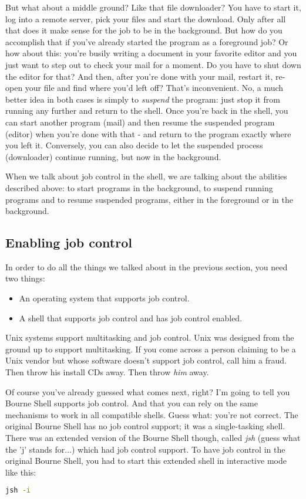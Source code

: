 But what about a middle ground? Like that file downloader? You have to start
it, log into a remote server, pick your files and start the download. Only
after all that does it make sense for the job to be in the background. But how
do you accomplish that if you've already started the program as a foreground
job? Or how about this: you're busily writing a document in your favorite
editor and you just want to step out to check your mail for a moment. Do you
have to shut down the editor for that? And then, after you're done with your
mail, restart it, re-open your file and find where you'd left off? That's
inconvenient. No, a much better idea in both cases is simply to
\textit{suspend} the program: just stop it from running any further and return
to the shell. Once you're back in the shell, you can start another program
(mail) and then resume the suspended program (editor) when you're done with
that - and return to the program exactly where you left it. Conversely, you can
also decide to let the suspended process (downloader) continue running, but now
in the background.

When we talk about job control in the shell, we are talking about the abilities
described above: to start programs in the background, to suspend running
programs and to resume suspended programs, either in the foreground or in the
background.

\subsection{Enabling job control}
In order to do all the things we talked about in the previous section, you need
two things:

\begin{itemize}
\setlength{\leftmargin}{0pt}
\setlength{\itemsep}{0pt}
\setlength{\parsep}{0pt}
\setlength{\parskip}{0pt}
\item An operating system that supports job control.
\item A shell that supports job control and has job control enabled.
\end{itemize}

Unix systems support multitasking and job control. Unix was designed from the
ground up to support multitasking. If you come across a person claiming to be a
Unix vendor but whose software doesn't support job control, call him a fraud.
Then throw his install CDs away. Then throw \textit{him} away.

Of course you've already guessed what comes next, right? I'm going to tell you
Bourne Shell supports job control. And that you can rely on the same mechanisms
to work in all compatible shells. Guess what: you're not correct. The original
Bourne Shell has no job control support; it was a single-tasking shell. There
was an extended version of the Bourne Shell though, called \textit{jsh} (guess
what the 'j' stands for...) which had job control support. To have job control
in the original Bourne Shell, you had to start this extended shell in
interactive mode like this:
\lstset{basicstyle=\scriptsize, numbers=left, captionpos=b, tabsize=4}
\begin{lstlisting}[language={bash},
xleftmargin=15pt]
jsh -i
\end{lstlisting}

